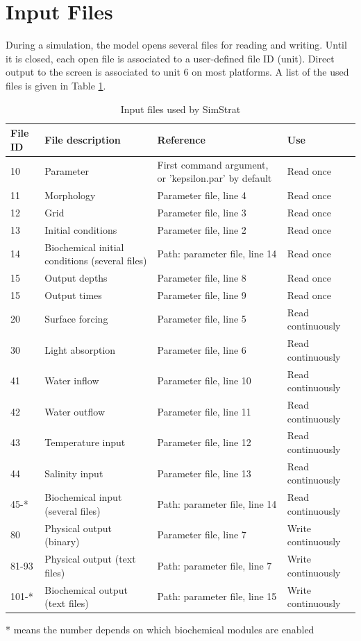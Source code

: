\documentclass[paper=a4, fontsize=12pt]{article}
\begin{document}
\section{Input Files}
During a simulation, the model opens several files for reading and writing. Until it is closed, each open file is associated to a user-defined file ID (unit). Direct output to the screen is associated to unit 6 on most platforms. A list of the used files is given in Table \ref{inputfiles}.

\begin{table}[h!]
	\caption{Input files used by SimStrat}
	\label{inputfiles}
	\begin{tabularx}{\textwidth}{lXXl}\toprule
		\textbf{File ID} & \textbf{File description} & \textbf{Reference} & \textbf{Use} \\
		\midrule
		10 & Parameter & First command argument, or 'kepsilon.par' by default & Read once \\
		11 & Morphology & Parameter file, line 4 & Read once \\
		12 & Grid & Parameter file, line 3 & Read once \\
		13 & Initial conditions & Parameter file, line 2 & Read once \\
		14 & Biochemical initial conditions (several files) & Path: parameter file, line 14 & Read once \\
		15 & Output depths & Parameter file, line 8 & Read once \\
		15 & Output times & Parameter file, line 9 & Read once \\
		20 & Surface forcing & Parameter file, line 5 & Read continuously \\
		30 & Light absorption & Parameter file, line 6 & Read continuously \\
		41 & Water inflow & Parameter file, line 10 & Read continuously \\
		42 & Water outflow & Parameter file, line 11 & Read continuously \\
		43 & Temperature input & Parameter file, line 12 & Read continuously \\
		44 & Salinity input & Parameter file, line 13 & Read continuously \\
		45-* & Biochemical input (several files) & Path: parameter file, line 14 & Read continuously \\
		80 & Physical output (binary) & Parameter file, line 7 & Write  continuously \\
		81-93 & Physical output (text files) & Path: parameter file, line 7 & Write  continuously \\
		101-* & Biochemical output (text files) & Path: parameter file, line 15 & Write  continuously \\
		\bottomrule
	\end{tabularx}\vspace{0.3em}
	* means the number depends on which biochemical modules are enabled
\end{table}
\end{document}
